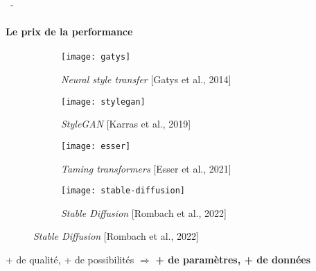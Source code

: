 \documentclass[aspectratio=169, 22pt]{beamer}
\begin{document}
\begin{frame}{\secname~- \subsecname}
  \framesubtitle{Le prix de la performance}
  \begin{figure}
    \begin{subfigure}{0.24\linewidth}
      \texttt{[image: gatys]}
      \caption{\emph{Neural style transfer} [Gatys et al., 2014]}
    \end{subfigure}
    \begin{subfigure}{0.24\linewidth}
      \texttt{[image: stylegan]}                
      \caption{\emph{StyleGAN} [Karras et al., 2019]}
    \end{subfigure}
    \begin{subfigure}{0.24\linewidth}
      \texttt{[image: esser]}                      
      \caption{\emph{Taming transformers} [Esser et al., 2021]}
    \end{subfigure}
    \begin{subfigure}{0.24\linewidth}
      \texttt{[image: stable-diffusion]}
      \caption{\emph{Stable Diffusion} [Rombach et al., 2022]}
    \end{subfigure}
  \end{figure}
  \begin{exampleblock}{}
    \centering
    + de qualité, + de possibilités $\Rightarrow$ \textbf{+ de \alert{paramètres}, + de \alert{données}}
  \end{exampleblock}
\end{frame}
\end{document}
